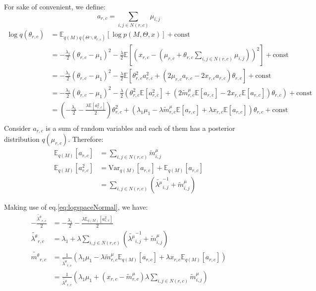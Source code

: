\documentclass[12pt]{article}
\newenvironment{problem}[2][Problem]{\begin{trivlist}
\item[\hskip \labelsep {\bfseries #1}\hskip \labelsep {\bfseries #2.}]}{\end{trivlist}}
\begin{document}
\begin{problem}{2.9.25}
For sake of convenient, we define:
\begin{equation}
    a_{r,c} = \sum_{i,j \in N(r,c)}\mu_{i,j}
\end{equation}
\begin{align*}
    \log q(\theta_{r,c}) &= 
        \mathbb{E}_{q(M)q(\Theta\backslash\theta_{r,c})}[\log p(M, \Theta, x)] 
        + \text{const} \\
    &= -\frac{\lambda_1}{2}(\theta_{r,c} - \mu_1)^2
    -\frac{\lambda}{2}\mathbb{E}[(x_{r,c} - (\mu_{r,c} + \theta_{r,c}\sum_{i,j \in N(r,c)}\mu_{i,j}))^2]
    + \text{const} \\
    &= -\frac{\lambda_1}{2}(\theta_{r,c} - \mu_1)^2
    -\frac{\lambda}{2}\mathbb{E}[\theta^2_{r,c}a_{r,c}^2 + (2\mu_{r,c}a_{r,c} - 2x_{r,c}a_{r,c})\theta_{r,c}]
    + \text{const} \\
    &=-\frac{\lambda_1}{2}(\theta_{r,c} - \mu_1)^2  
    -\frac{\lambda}{2}(\theta^2_{r,c}\mathbb{E}[a_{r,c}^2] 
            + (2\tilde{m}^{\mu}_{r,c}\mathbb{E}[a_{r,c}] - 2x_{r,c}\mathbb{E}[a_{r,c}])\theta_{r,c})
    + \text{const} \\
    &= (-\frac{\lambda_1}{2} -\frac{\lambda\mathbb{E}[a_{r,c}^2]}{2})\theta_{r,c}^2 
    + (\lambda_1\mu_1 - \lambda\tilde{m}^{\mu}_{r,c}\mathbb{E}[a_{r,c}] + \lambda x_{r,c}\mathbb{E}[a_{r,c}])\theta_{r,c}
    + \text{const} \\
\end{align*}
Consider $a_{r,c}$ is a sum of random variables and each of them has a posterior distribution $q(\mu_{r,c})$. 
Therefore:
\begin{align*}
    \mathbb{E}_{q(M)}[a_{r,c}] &= \sum_{i,j \in N(r,c)}\tilde{m}^{\mu}_{i,j} \\
    \mathbb{E}_{q(M)}[a_{r,c}^2] &= \mathrm{Var}_{q(M)}[a_{r,c}] + \mathbb{E}_{q(M)}[a_{r,c}] \\
    &= \sum_{i,j \in N(r,c)}(\tilde{\lambda^{\mu}}^{-1}_{i,j} + \tilde{m}^{\mu}_{i,j})
\end{align*}

Making use of eq.\eqref{eq:logspaceNormal}, we have:
\begin{align*}
    -\frac{\tilde{\lambda^{\theta}}_{r,c}}{2} 
    &= -\frac{\lambda_1}{2} -\frac{\lambda\mathbb{E}_{q(M)}[a_{r,c}^2]}{2} \\
    \tilde{\lambda^{\theta}}_{r,c}
    &= \lambda_1 + \lambda\sum_{i,j \in N(r,c)}(\tilde{\lambda^{\mu}}^{-1}_{i,j} + \tilde{m}^{\mu}_{i,j}) \\
    \tilde{m^{\theta}}_{r,c} 
    &= \frac{1}{\tilde{\lambda^{\theta}}_{r,c}}
    (\lambda_1\mu_1 - \lambda\tilde{m}^{\mu}_{r,c}\mathbb{E}_{q(M)}[a_{r,c}] + \lambda x_{r,c}\mathbb{E}_{q(M)}[a_{r,c}]) \\
    &= \frac{1}{\tilde{\lambda^{\theta}}_{r,c}}
    (\lambda_1\mu_1 + (x_{r,c} - \tilde{m}^{\mu}_{r,c})\lambda\sum_{i,j \in N(r,c)}\tilde{m}^{\mu}_{i,j})
\end{align*}


\end{problem}
\end{document}
